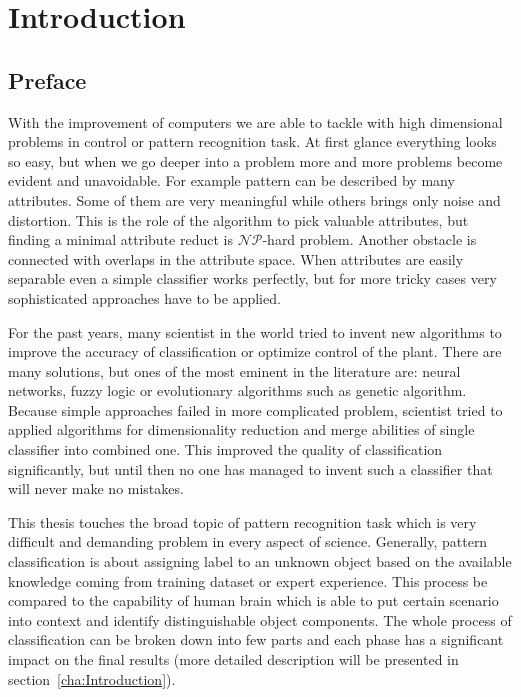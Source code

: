 \section{Introduction}
\subsection{Preface}
\label{cha:Goals}
With the improvement of computers we are able to tackle with high dimensional 
problems in control or pattern recognition task. At first glance everything
looks so easy, but when we go deeper into a problem more and more problems 
become evident and unavoidable. For example pattern can be described by many 
attributes. Some of them are very meaningful while others brings only noise 
and distortion. This is the role of the algorithm to pick valuable attributes,
but finding a minimal attribute reduct is $\mathcal{NP}$-hard problem. Another
obstacle is connected with overlaps in the attribute space. When attributes 
are easily separable even a simple classifier works perfectly, but for more 
tricky cases very sophisticated approaches have to be applied.

For the past years, many scientist in the world tried to invent new algorithms 
to improve the accuracy of classification or optimize control of the plant.
There are many solutions, but ones of the most eminent in the literature are: 
neural networks, fuzzy logic or evolutionary algorithms such as genetic algorithm. 
Because simple approaches failed in more complicated problem, scientist tried to applied 
algorithms for dimensionality reduction and merge abilities of single
classifier into combined one. This improved the quality of classification 
significantly, but until then no one has managed to invent such a classifier 
that will never make no mistakes.

This thesis touches the broad topic of pattern recognition task which is 
very difficult and demanding problem in every aspect of science. Generally, 
pattern classification is about assigning label to an unknown object based 
on the available knowledge coming from training dataset or expert experience.
This process be compared to the capability of human brain which is able to put 
certain scenario into context and identify distinguishable object components. 
The whole process of classification can be broken down into few parts and each 
phase has a significant impact on the final results (more detailed description
will be presented in section~\ref{cha:Introduction}).

